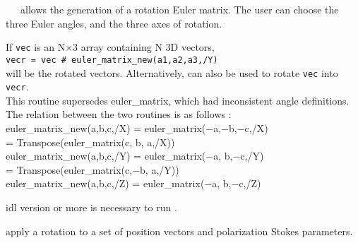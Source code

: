 \begin{codedescription}
{\parbox[t]{\hsize}{\facname\ ~\ allows the generation of a rotation Euler matrix. The user
can choose the three Euler angles, and the three axes of rotation.

If \texttt{vec} is an N$\times$3 array containing N 3D vectors, \\
    \texttt{vecr = vec  \# euler\_matrix\_new(a1,a2,a3,/Y)}\\
will be the rotated vectors. 
Alternatively,  can also be used to rotate 
\texttt{vec} into \texttt{vecr}.\\
 
\small{
This routine supersedes euler\_matrix, which had inconsistent angle
definitions. The relation between the two routines is as follows  :
\\[.1cm]
%
euler\_matrix\_new(a,b,c,/X)  =  euler\_matrix($-$a,$-$b,$-$c,/X) \\
= Transpose(euler\_matrix(c, b, a,/X)) \\[.1cm]
%
euler\_matrix\_new(a,b,c,/Y)  =  euler\_matrix($-$a, b,$-$c,/Y) \\
= Transpose(euler\_matrix(c,$-$b, a,/Y)) \\[.1cm]
%
euler\_matrix\_new(a,b,c,/Z)  =  euler\_matrix($-$a, b,$-$c,/Z)
}
}}
\end{codedescription}

\begin{related}
  \begin{sulist}{} %
    \item[idl] version \idlversion or more is necessary to run \thedocid.
    \item[\htmlref{rotate\_coord}{idl:rotate_coord}] apply a rotation to a set of position vectors and
    polarization Stokes parameters.
  \end{sulist}
\end{related}


